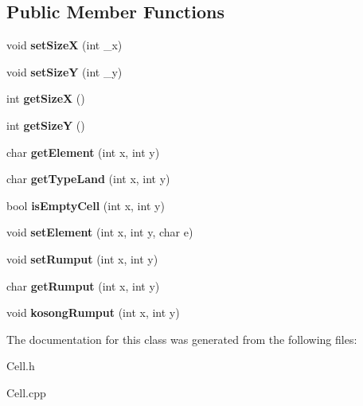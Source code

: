 \subsection*{Public Member Functions}
\begin{DoxyCompactItemize}
\item 
\mbox{\label{classCell_a4587583f159885e3e09650e777988176}} 
void {\bfseries set\+SizeX} (int \+\_\+x)
\item 
\mbox{\label{classCell_a6b6e9b781f962b69fff0ba274998e2b4}} 
void {\bfseries set\+SizeY} (int \+\_\+y)
\item 
\mbox{\label{classCell_ac11f7f99bf26aa1b0a38962bc7040bb8}} 
int {\bfseries get\+SizeX} ()
\item 
\mbox{\label{classCell_a70e8a8336e5b8be2d763849266b1827b}} 
int {\bfseries get\+SizeY} ()
\item 
\mbox{\label{classCell_aaf9d3b41f814fb44099b486878967a1e}} 
char {\bfseries get\+Element} (int x, int y)
\item 
\mbox{\label{classCell_abc9ffffff68c51b3ad5e4c94e267d4a8}} 
char {\bfseries get\+Type\+Land} (int x, int y)
\item 
\mbox{\label{classCell_a48bc12937e6590e6434dd81eedc55986}} 
bool {\bfseries is\+Empty\+Cell} (int x, int y)
\item 
\mbox{\label{classCell_a6fe3c12c2174d452f6d2eaff486d47a0}} 
void {\bfseries set\+Element} (int x, int y, char e)
\item 
\mbox{\label{classCell_a0a0af2c298226adb5d9abf3444dd7bbe}} 
void {\bfseries set\+Rumput} (int x, int y)
\item 
\mbox{\label{classCell_ac25367aae3da7a73fd2f9c08bf42b226}} 
char {\bfseries get\+Rumput} (int x, int y)
\item 
\mbox{\label{classCell_a2b65fb5349b7122e24cc5086ae8e9ac0}} 
void {\bfseries kosong\+Rumput} (int x, int y)
\end{DoxyCompactItemize}


The documentation for this class was generated from the following files\+:\begin{DoxyCompactItemize}
\item 
Cell.\+h\item 
Cell.\+cpp\end{DoxyCompactItemize}
